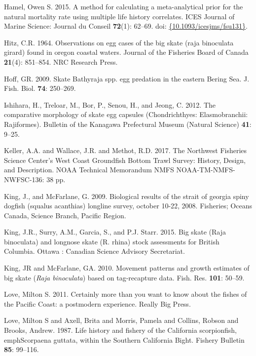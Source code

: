 \documentclass[12pt,]{article}
\begin{document}
\leavevmode\hypertarget{ref-Hamel2015}{}%
Hamel, Owen S. 2015. A method for calculating a meta-analytical prior
for the natural mortality rate using multiple life history correlates.
ICES Journal of Marine Science: Journal du Conseil \textbf{72}(1):
62--69. doi:
\href{https://doi.org/\%7B10.1093/icesjms/fsu131\%7D}{\{10.1093/icesjms/fsu131\}}.

\leavevmode\hypertarget{ref-Hitz1964}{}%
Hitz, C.R. 1964. Observations on egg cases of the big skate (raja
binoculata girard) found in oregon coastal waters. Journal of the
Fisheries Board of Canada \textbf{21}(4): 851--854. NRC Research Press.

\leavevmode\hypertarget{ref-Hoff2009}{}%
Hoff, GR. 2009. Skate Bathyraja spp. egg predation in the eastern Bering
Sea. J. Fish. Biol. \textbf{74}: 250--269.

\leavevmode\hypertarget{ref-Ishihara2012}{}%
Ishihara, H., Treloar, M., Bor, P., Senou, H., and Jeong, C. 2012. The
comparative morphology of skate egg capsules (Chondrichthyes:
Elasmobranchii: Rajiformes). Bulletin of the Kanagawa Prefectural Museum
(Natural Science) \textbf{41}: 9--25.

\leavevmode\hypertarget{ref-Keller2017}{}%
Keller, A.A. and Wallace, J.R. and Methot, R.D. 2017. The Northwest
Fisheries Science Center's West Coast Groundfish Bottom Trawl Survey:
History, Design, and Description. NOAA Technical Memorandum NMFS
NOAA-TM-NMFS-NWFSC-136: 38 pp.

\leavevmode\hypertarget{ref-KingandMcF2009}{}%
King, J., and McFarlane, G. 2009. Biological results of the strait of
georgia spiny dogfish (squalus acanthias) longline survey, october
10-22, 2008. Fisheries; Oceans Canada, Science Branch, Pacific Region.

\leavevmode\hypertarget{ref-King2015}{}%
King, J.R., Surry, A.M., Garcia, S., and P.J. Starr. 2015. Big skate
(Raja binoculata) and longnose skate (R. rhina) stock assessments for
British Columbia. Ottawa : Canadian Science Advisory Secretariat.

\leavevmode\hypertarget{ref-KingandMcF2010}{}%
King, JR and McFarlane, GA. 2010. Movement patterns and growth estimates
of big skate (\emph{Raja binoculata}) based on tag-recapture data. Fish.
Res. \textbf{101}: 50--59.

\leavevmode\hypertarget{ref-Love2011}{}%
Love, Milton S. 2011. Certainly more than you want to know about the
fishes of the Pacific Coast: a postmodern experience. Really Big Press.

\leavevmode\hypertarget{ref-Love1987}{}%
Love, Milton S and Axell, Brita and Morris, Pamela and Collins, Robson
and Brooks, Andrew. 1987. Life history and fishery of the California
scorpionfish,\\
emphScorpaena guttata, within the Southern California Bight. Fishery
Bulletin \textbf{85}: 99--116.
\end{document}
